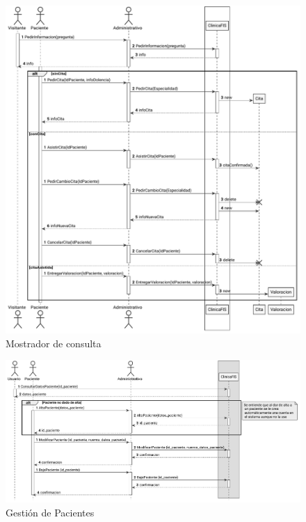 \documentclass[11pt,a4paper]{article}
\begin{document}
\begin{figure}[H]
	\caption{Mostrador de consulta}
	\centering
	\includegraphics{diagramas/pdf/diagramaMostrador.pdf}
\end{figure}

\begin{figure}[H]
	\caption{Gestión de Pacientes}
	\centering
	\includegraphics{diagramas/pdf/diagramaPaciente.pdf}
\end{figure}
\end{document}
